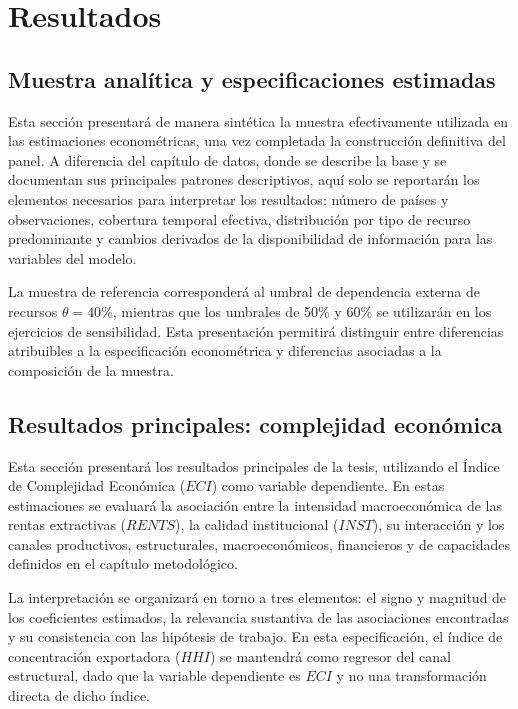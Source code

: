 \documentclass[../../PTFM.tex]{subfiles}
\begin{document}
	\chapter{Resultados}
	\label{chap:resultados}

	\section{Muestra analítica y especificaciones estimadas}
	\label{sec:muestra-analitica-resultados}

	Esta sección presentará de manera sintética la muestra efectivamente utilizada en las estimaciones econométricas, una vez completada la construcción definitiva del panel. A diferencia del capítulo de datos, donde se describe la base y se documentan sus principales patrones descriptivos, aquí solo se reportarán los elementos necesarios para interpretar los resultados: número de países y observaciones, cobertura temporal efectiva, distribución por tipo de recurso predominante y cambios derivados de la disponibilidad de información para las variables del modelo.

	La muestra de referencia corresponderá al umbral de dependencia externa de recursos $\theta=40\%$, mientras que los umbrales de 50\% y 60\% se utilizarán en los ejercicios de sensibilidad. Esta presentación permitirá distinguir entre diferencias atribuibles a la especificación econométrica y diferencias asociadas a la composición de la muestra.


	\section{Resultados principales: complejidad económica}
	\label{sec:resultados-eci}

	Esta sección presentará los resultados principales de la tesis, utilizando el Índice de Complejidad Económica ($ECI$) como variable dependiente. En estas estimaciones se evaluará la asociación entre la intensidad macroeconómica de las rentas extractivas ($RENTS$), la calidad institucional ($INST$), su interacción y los canales productivos, estructurales, macroeconómicos, financieros y de capacidades definidos en el capítulo metodológico.

	La interpretación se organizará en torno a tres elementos: el signo y magnitud de los coeficientes estimados, la relevancia sustantiva de las asociaciones encontradas y su consistencia con las hipótesis de trabajo. En esta especificación, el índice de concentración exportadora ($HHI$) se mantendrá como regresor del canal estructural, dado que la variable dependiente es $ECI$ y no una transformación directa de dicho índice.
\end{document}
